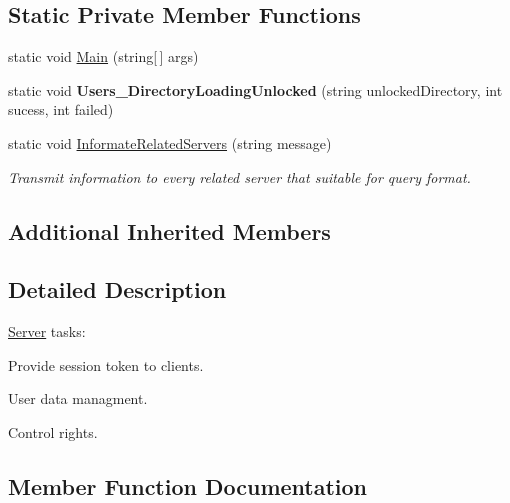 \subsection*{Static Private Member Functions}
\begin{DoxyCompactItemize}
\item 
static void \mbox{\hyperlink{class_session_provider_1_1_server_a78068e966b78f7579b01ba80f53b87ea}{Main}} (string\mbox{[}$\,$\mbox{]} args)
\item 
\mbox{\label{class_session_provider_1_1_server_ad75d498e5203fe80a725f54ec955ace2}} 
static void {\bfseries Users\+\_\+\+Directory\+Loading\+Unlocked} (string unlocked\+Directory, int sucess, int failed)
\item 
static void \mbox{\hyperlink{class_session_provider_1_1_server_a79f535be5b1dd781de2982f0b34ea4f9}{Informate\+Related\+Servers}} (string message)
\begin{DoxyCompactList}\small\item\em Transmit information to every related server that suitable for query format. \end{DoxyCompactList}\end{DoxyCompactItemize}
\subsection*{Additional Inherited Members}


\subsection{Detailed Description}
\mbox{\hyperlink{class_session_provider_1_1_server}{Server}} tasks\+: 


\begin{DoxyItemize}
\item Provide session token to clients.
\item User data managment.
\item Control rights. 
\end{DoxyItemize}

\subsection{Member Function Documentation}
\mbox{\label{class_session_provider_1_1_server_a79f535be5b1dd781de2982f0b34ea4f9}} 
